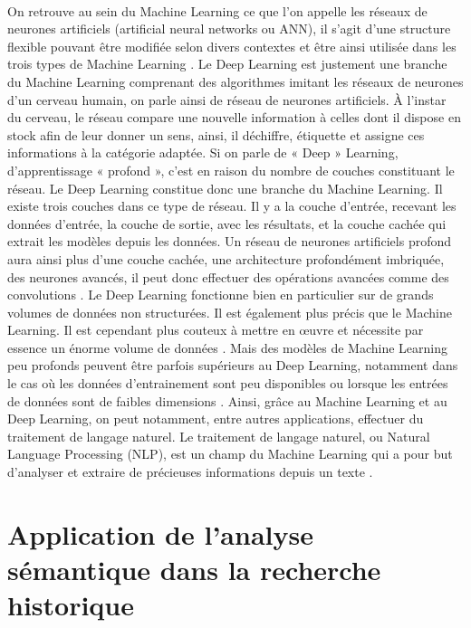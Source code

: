 \documentclass{article}
\begin{document}
\paragraph{}
On retrouve au sein du Machine Learning ce que l’on appelle les réseaux de neurones artificiels (artificial neural networks ou ANN), il s’agit d’une structure flexible pouvant être modifiée selon divers contextes et être ainsi utilisée dans les trois types de Machine Learning \cite{janiesch2021machine}. 
Le Deep Learning est justement une branche du Machine Learning comprenant des algorithmes imitant les réseaux de neurones d’un cerveau humain, on parle ainsi de réseau de neurones artificiels. À l’instar du cerveau, le réseau compare une nouvelle information à celles dont il dispose en stock afin de leur donner un sens, ainsi, il déchiffre, étiquette et assigne ces informations à la catégorie adaptée. Si on parle de « Deep » Learning, d’apprentissage « profond », c’est en raison du nombre de couches constituant le réseau. Le Deep Learning constitue donc une branche du Machine Learning. Il existe trois couches dans ce type de réseau. Il y a la couche d’entrée, recevant les données d’entrée, la couche de sortie, avec les résultats, et la couche cachée qui extrait les modèles depuis les données. Un réseau de neurones artificiels profond aura ainsi plus d’une couche cachée, une architecture profondément imbriquée, des neurones avancés, il peut donc effectuer des opérations avancées comme des convolutions \cite{janiesch2021machine}. Le Deep Learning fonctionne bien en particulier sur de grands volumes de données non structurées. Il est également plus précis que le Machine Learning. Il est cependant plus couteux à mettre en œuvre et nécessite par essence un énorme volume de données \cite{jakhar2020artificial}. Mais des modèles de Machine Learning peu profonds peuvent être parfois supérieurs au Deep Learning, notamment dans le cas où les données d’entrainement sont peu disponibles ou lorsque les entrées de données sont de faibles dimensions \cite{janiesch2021machine}. 
Ainsi, grâce au Machine Learning et au Deep Learning, on peut notamment, entre autres applications, effectuer du traitement de langage naturel. Le traitement de langage naturel, ou Natural Language Processing (NLP), est un champ du Machine Learning qui a pour but d’analyser et extraire de précieuses informations depuis un texte \cite{di2021latin}. 
\section{Application de l'analyse sémantique dans la recherche historique}
\end{document}
